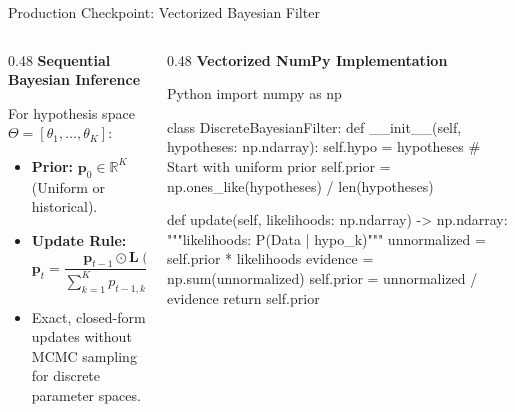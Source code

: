 \documentclass[../m00-session-03.tex]{subfiles}
\begin{document}
\begin{frame}[fragile]{Production Checkpoint: Vectorized Bayesian Filter}
  \begin{columns}[T,onlytextwidth]
    \begin{column}{0.48\textwidth}
      {\small\bfseries\color{UpGradNight}Sequential Bayesian Inference}\par\vspace{0.08cm}
      For hypothesis space $\Theta = [\theta_1, \dots, \theta_K]$:
      \begin{itemize}\setlength{\itemsep}{0.20em}\small
        \item \textbf{Prior:} $\mathbf{p}_0 \in \mathbb{R}^K$ (Uniform or historical).
        \item \textbf{Update Rule:}
          \[
          \mathbf{p}_{t} = \frac{\mathbf{p}_{t-1} \odot \mathbf{L}(\text{obs} \mid \Theta)}{\sum_{k=1}^K p_{t-1,k} L(\text{obs} \mid \theta_k)}
          \]
        \item Exact, closed-form updates without MCMC sampling for discrete parameter spaces.
      \end{itemize}
    \end{column}
    \hfill
    \begin{column}{0.48\textwidth}
      {\small\bfseries\color{UpGradRed}Vectorized NumPy Implementation}\par\vspace{0.06cm}
\begin{CodeBlock}{Python}
import numpy as np

class DiscreteBayesianFilter:
    def __init__(self, hypotheses: np.ndarray):
        self.hypo = hypotheses
        # Start with uniform prior
        self.prior = np.ones_like(hypotheses) / len(hypotheses)

    def update(self, likelihoods: np.ndarray) -> np.ndarray:
        """likelihoods: P(Data | hypo_k)"""
        unnormalized = self.prior * likelihoods
        evidence = np.sum(unnormalized)
        self.prior = unnormalized / evidence
        return self.prior
\end{CodeBlock}
    \end{column}
  \end{columns}
\end{frame}
\end{document}
